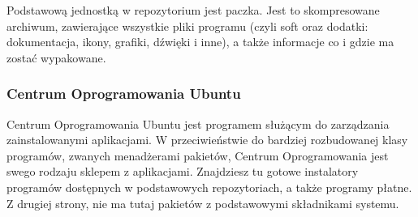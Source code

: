 Podstawową jednostką w repozytorium jest paczka. Jest to skompresowane archiwum, zawierające wszystkie pliki programu (czyli soft oraz dodatki: dokumentacja, ikony, grafiki, dźwięki i inne), a także informacje co i gdzie ma zostać wypakowane.

\subsubsection{Centrum Oprogramowania Ubuntu}
\textcolor{ubuntu_orange}{Centrum Oprogramowania Ubuntu} jest programem służącym do zarządzania zainstalowanymi aplikacjami. W przeciwieństwie do bardziej rozbudowanej klasy programów, zwanych menadżerami pakietów, Centrum Oprogramowania jest swego rodzaju sklepem z aplikacjami. Znajdziesz tu gotowe instalatory programów dostępnych w podstawowych repozytoriach, a także programy płatne. Z drugiej strony, nie ma tutaj pakietów z podstawowymi składnikami systemu.

\begin{center}
\end{center}

